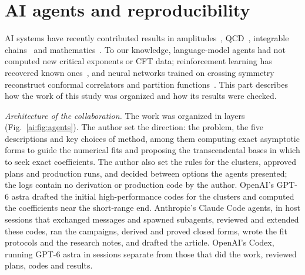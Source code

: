 

\section*{AI agents and reproducibility}\label{ai:combined:front:start}

AI systems have recently contributed results in amplitudes~\cite{ai:Guevara:2026qzd,ai:Arkani-Hamed:2026rsz}, QCD~\cite{ai:Schwartz:2026ekw}, integrable chains~\cite{ai:Pozsgay:2026hvh} and mathematics~\cite{ai:Romera-Paredes:2024fs}. To our knowledge, language-model agents had not computed new critical exponents or CFT data; reinforcement learning has recovered known ones~\cite{ai:Kantor:2021kbx,ai:Man:2025rl}, and neural networks trained on crossing symmetry reconstruct conformal correlators and partition functions~\cite{ai:Ghosh:2026xnp,ai:Ghosh:2026efw}. This part describes how the work of this study was organized and how its results were checked.

\textit{Architecture of the collaboration.} The work was organized in layers (Fig.~\ref{ai:fig:agents}). The author set the direction: the problem, the five descriptions and key choices of method, among them computing exact asymptotic forms to guide the numerical fits and proposing the transcendental bases in which to seek exact coefficients. The author also set the rules for the clusters, approved plans and production runs, and decided between options the agents presented; the logs contain no derivation or production code by the author. OpenAI's GPT-6 astra drafted the initial high-performance codes for the clusters and computed the coefficients near the short-range end. Anthropic's Claude Code agents, in host sessions that exchanged messages and spawned subagents, reviewed and extended these codes, ran the campaigns, derived and proved closed forms, wrote the fit protocols and the research notes, and drafted the article. OpenAI's Codex, running GPT-6 astra in sessions separate from those that did the work, reviewed plans, codes and results.



